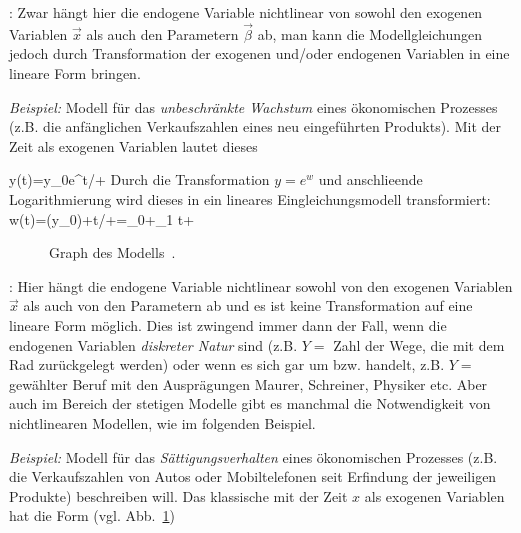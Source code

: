 \item {}: Zwar h\"angt hier
die endogene 
Variable nichtlinear von sowohl den exogenen Variablen $\vec{x}$ als
auch den Parametern $\vec{\beta}$ ab, man kann die Modellgleichungen
jedoch  durch Transformation der
exogenen und/oder endogenen Variablen in eine lineare Form bringen. 

\emph{Beispiel:} Modell f\"ur das
\emph{unbeschr\"ankte Wachstum} eines \"okonomischen Prozesses
(z.B. die anf\"anglichen Verkaufszahlen eines neu eingef\"uhrten
Produkts). Mit der Zeit als exogenen Variablen lautet dieses

\be
\label{unlimitedGrowth}
y(t)=y_0e^{t/\tau+\epsilon}
\ee
Durch die Transformation $y=e^w$ und anschlie\3ende Logarithmierung
 wird dieses in ein lineares
Eingleichungsmodell transformiert:
\be
\label{unlimitedGrowthLog}
w(t)=\ln(y_0)+t/\tau+\epsilon=\beta_0+\beta_1 t+\epsilon
\ee
{}


\begin{figure}
\caption{\label{fig:limitedGrowth} Graph des
Modells~.
}
\end{figure}


\item {}: Hier h\"angt die endogene
Variable nichtlinear sowohl von den exogenen Variablen $\vec{x}$ als
auch von den Parametern ab und es ist keine Transformation auf eine
lineare Form m\"oglich. Dies ist zwingend immer dann der Fall,
wenn die endogenen Variablen \emph{diskreter Natur} sind (z.B. $Y=$ Zahl der
Wege, die mit dem Rad zur\"uckgelegt werden) oder wenn es sich gar um
 bzw.  handelt,
z.B. $Y=$ gew\"ahlter Beruf mit den Auspr\"agungen Maurer, Schreiner,
Physiker etc. Aber auch im Bereich der stetigen Modelle gibt es
manchmal die Notwendigkeit von nichtlinearen Modellen, wie im
folgenden Beispiel.

\emph{Beispiel:} Modell f\"ur das
\emph{S\"attigungsverhalten} eines \"okonomischen
Prozesses (z.B. die Verkaufszahlen von Autos oder Mobiltelefonen seit
Erfindung der jeweiligen Produkte) beschreiben will. Das klassische
 mit der Zeit $x$ als exogenen
Variablen hat die Form (vgl. Abb.~\ref{fig:limitedGrowth})

